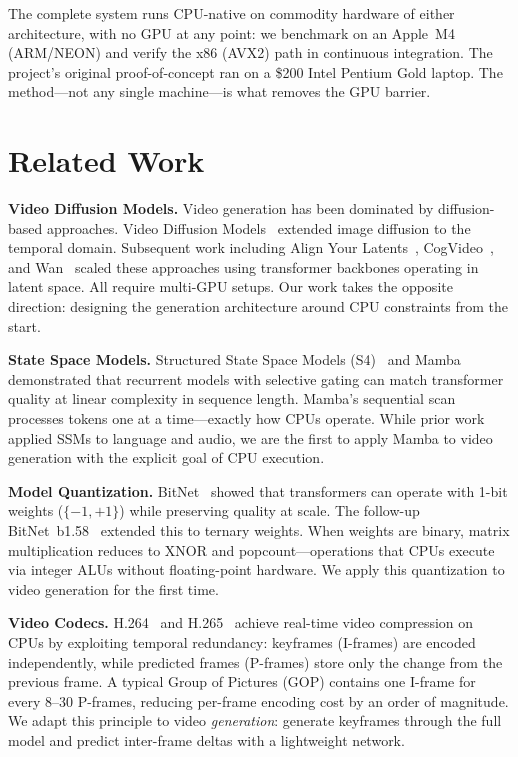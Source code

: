 \documentclass[11pt]{article}
\begin{document}
The complete system runs CPU-native on commodity hardware of either architecture, with no GPU at any point: we benchmark on an Apple~M4 (ARM/NEON) and verify the x86 (AVX2) path in continuous integration. The project's original proof-of-concept ran on a \$200 Intel Pentium Gold laptop. The method---not any single machine---is what removes the GPU barrier.


\section{Related Work}

\textbf{Video Diffusion Models.}
Video generation has been dominated by diffusion-based approaches. Video Diffusion Models~\citep{ho2022video} extended image diffusion to the temporal domain. Subsequent work including Align Your Latents~\citep{blattmann2023videoldm}, CogVideo~\citep{hong2022cogvideo}, and Wan~\citep{wan2024} scaled these approaches using transformer backbones operating in latent space. All require multi-GPU setups. Our work takes the opposite direction: designing the generation architecture around CPU constraints from the start.

\textbf{State Space Models.}
Structured State Space Models (S4)~\citep{gu2022efficiently} and Mamba~\citep{gu2023mamba} demonstrated that recurrent models with selective gating can match transformer quality at linear complexity in sequence length. Mamba's sequential scan processes tokens one at a time---exactly how CPUs operate. While prior work applied SSMs to language and audio, we are the first to apply Mamba to video generation with the explicit goal of CPU execution.

\textbf{Model Quantization.}
BitNet~\citep{wang2023bitnet} showed that transformers can operate with 1-bit weights ($\{-1, +1\}$) while preserving quality at scale. The follow-up BitNet~b1.58~\citep{ma2024era} extended this to ternary weights. When weights are binary, matrix multiplication reduces to XNOR and popcount---operations that CPUs execute via integer ALUs without floating-point hardware. We apply this quantization to video generation for the first time.

\textbf{Video Codecs.}
H.264~\citep{wiegand2003h264} and H.265~\citep{sullivan2012h265} achieve real-time video compression on CPUs by exploiting temporal redundancy: keyframes (I-frames) are encoded independently, while predicted frames (P-frames) store only the change from the previous frame. A typical Group of Pictures (GOP) contains one I-frame for every 8--30 P-frames, reducing per-frame encoding cost by an order of magnitude. We adapt this principle to video \emph{generation}: generate keyframes through the full model and predict inter-frame deltas with a lightweight network.
\end{document}
